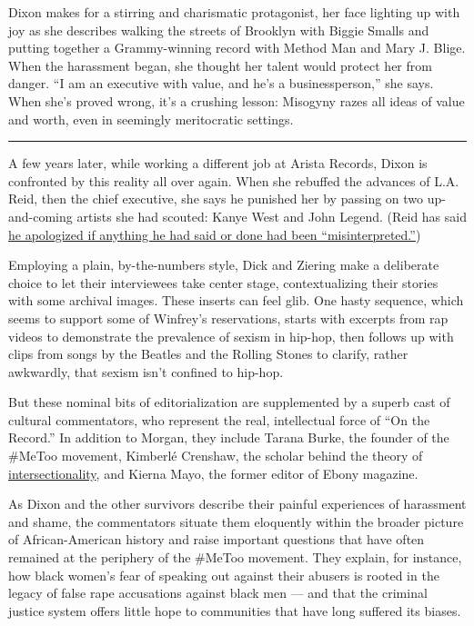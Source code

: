 Dixon makes for a stirring and charismatic protagonist, her face
lighting up with joy as she describes walking the streets of Brooklyn
with Biggie Smalls and putting together a Grammy-winning record with
Method Man and Mary J. Blige. When the harassment began, she thought her
talent would protect her from danger. ``I am an executive with value,
and he's a businessperson,'' she says. When she's proved wrong, it's a
crushing lesson: Misogyny razes all ideas of value and worth, even in
seemingly meritocratic settings.

\begin{center}\rule{0.5\linewidth}{\linethickness}\end{center}

A few years later, while working a different job at Arista Records,
Dixon is confronted by this reality all over again. When she rebuffed
the advances of L.A. Reid, then the chief executive, she says he
punished her by passing on two up-and-coming artists she had scouted:
Kanye West and John Legend. (Reid has said
\href{https://www.buzzfeednews.com/article/michaelblackmon/drew-dixon-profile-russell-simmons-me-too-rape}{he
apologized if anything he had said or done had been
``misinterpreted.''})

Employing a plain, by-the-numbers style, Dick and Ziering make a
deliberate choice to let their interviewees take center stage,
contextualizing their stories with some archival images. These inserts
can feel glib. One hasty sequence, which seems to support some of
Winfrey's reservations, starts with excerpts from rap videos to
demonstrate the prevalence of sexism in hip-hop, then follows up with
clips from songs by the Beatles and the Rolling Stones to clarify,
rather awkwardly, that sexism isn't confined to hip-hop.

But these nominal bits of editorialization are supplemented by a superb
cast of cultural commentators, who represent the real, intellectual
force of ``On the Record.'' In addition to Morgan, they include Tarana
Burke, the founder of the \#MeToo movement, Kimberlé Crenshaw, the
scholar behind the theory of
\href{https://time.com/5786710/kimberle-crenshaw-intersectionality/}{intersectionality},
and Kierna Mayo, the former editor of Ebony magazine.

As Dixon and the other survivors describe their painful experiences of
harassment and shame, the commentators situate them eloquently within
the broader picture of African-American history and raise important
questions that have often remained at the periphery of the \#MeToo
movement. They explain, for instance, how black women's fear of speaking
out against their abusers is rooted in the legacy of false rape
accusations against black men --- and that the criminal justice system
offers little hope to communities that have long suffered its biases.


